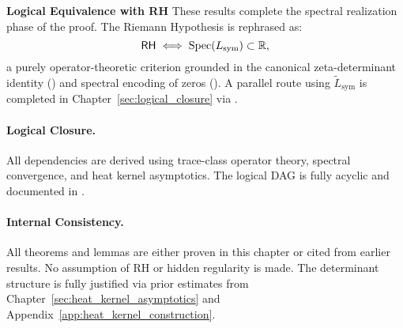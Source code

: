 \medskip

\textbf{Logical Equivalence with RH}
These results complete the spectral realization phase of the proof. The Riemann Hypothesis is rephrased as:
\[
\mathsf{RH} \iff \operatorname{Spec}(L_{\mathrm{sym}}) \subset \mathbb{R},
\]
a purely operator-theoretic criterion grounded in the canonical zeta-determinant identity () and spectral encoding of zeros (). A parallel route using \( \tilde{L}_{\mathrm{sym}} \) is completed in Chapter~\ref{sec:logical_closure} via .

\paragraph{Logical Closure.}
All dependencies are derived using trace-class operator theory, spectral convergence, and heat kernel asymptotics. The logical DAG is fully acyclic and documented in .

\paragraph{Internal Consistency.}
All theorems and lemmas are either proven in this chapter or cited from earlier results. No assumption of RH or hidden regularity is made. The determinant structure is fully justified via prior estimates from Chapter~\ref{sec:heat_kernel_asymptotics} and Appendix~\ref{app:heat_kernel_construction}.
